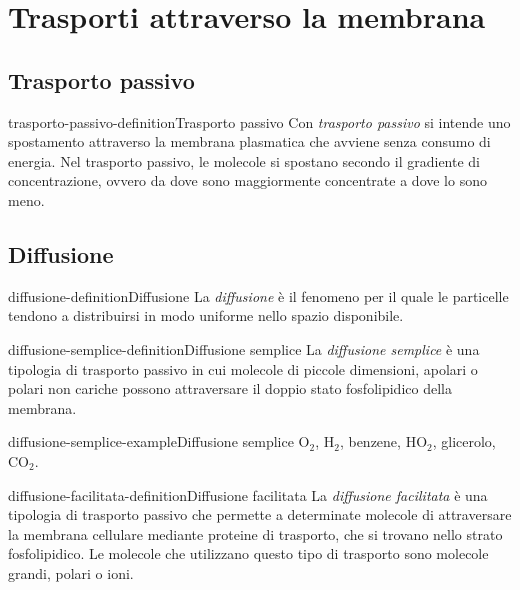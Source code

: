 \documentclass[preview]{standalone}
\begin{document}
\section{Trasporti attraverso la membrana}

\subsection{Trasporto passivo}

\begin{snippetdefinition}{trasporto-passivo-definition}{Trasporto passivo}
    Con \textit{trasporto passivo} si intende uno spostamento attraverso
    la membrana plasmatica che avviene senza consumo di energia.
    Nel trasporto passivo, le molecole si spostano secondo il gradiente di concentrazione,
    ovvero da dove sono maggiormente concentrate a dove lo sono meno.
\end{snippetdefinition}


\subsection{Diffusione}

\begin{snippetdefinition}{diffusione-definition}{Diffusione}
    La \textit{diffusione} è il fenomeno per il quale le particelle tendono a distribuirsi in modo
    uniforme nello spazio disponibile.
\end{snippetdefinition}

\begin{snippetdefinition}{diffusione-semplice-definition}{Diffusione semplice}
    La \textit{diffusione semplice} è una tipologia di trasporto passivo in cui molecole di piccole dimensioni, apolari o polari
    non cariche possono attraversare il doppio stato fosfolipidico della membrana.
\end{snippetdefinition}

\begin{snippetexample}{diffusione-semplice-example}{Diffusione semplice}
    O\({}_2\), H\({}_2\), benzene, HO\({}_2\), glicerolo, CO\({}_2\).
\end{snippetexample}

\begin{snippetdefinition}{diffusione-facilitata-definition}{Diffusione facilitata}
    La \textit{diffusione facilitata} è una tipologia di trasporto passivo che permette a determinate molecole di attraversare la
    membrana cellulare mediante proteine di trasporto, che si trovano nello strato fosfolipidico.
    Le molecole che utilizzano questo tipo di trasporto sono molecole grandi, polari o ioni.
\end{snippetdefinition}
\end{document}

